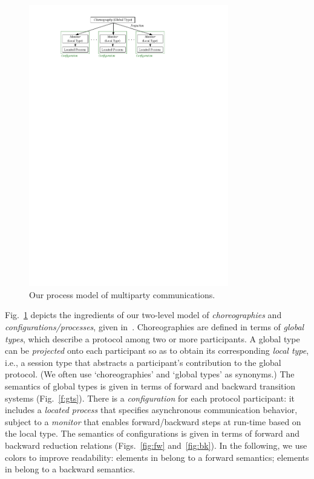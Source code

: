 \documentclass[runningheads]{llncs}
\begin{document}
\begin{figure}[!t]
\begin{center}
    \includegraphics[width=8.7cm]{./img/figmodel.pdf}
\end{center}
\vspace{-4mm}
\caption{Our process model of multiparty communications.}\label{f:model}
\end{figure}
Fig.~\ref{f:model} depicts the ingredients of our
two-level model of \emph{choreographies} and \emph{configurations/processes}, given in~\cite{DBLP:conf/ppdp/MezzinaP17}.
Choreographies are defined in terms of \emph{global types}, which describe a protocol among two or more participants. 
A global type can be \emph{projected} onto each participant so as to obtain 
its corresponding  \emph{local type}, i.e., a session type that abstracts a participant's contribution to the global protocol. 
(We often use `choreographies' and `global types' as synonyms.)
The semantics of global types is given in terms of forward and backward  transition systems (Fig.~\ref{f:gts}). 
There is a \emph{configuration} for each protocol participant: it includes a \emph{located process}
that 
 specifies asynchronous communication behavior, subject to a \emph{monitor}
that enables forward/backward steps at run-time
based on the local type.
The semantics of configurations is given in terms of forward and backward reduction relations (Figs.~\ref{fig:fw} and~\ref{fig:bk}).
In the following, we  use colors to improve readability:
elements in  belong to a forward semantics;
elements in  belong to a backward semantics.
\end{document}
